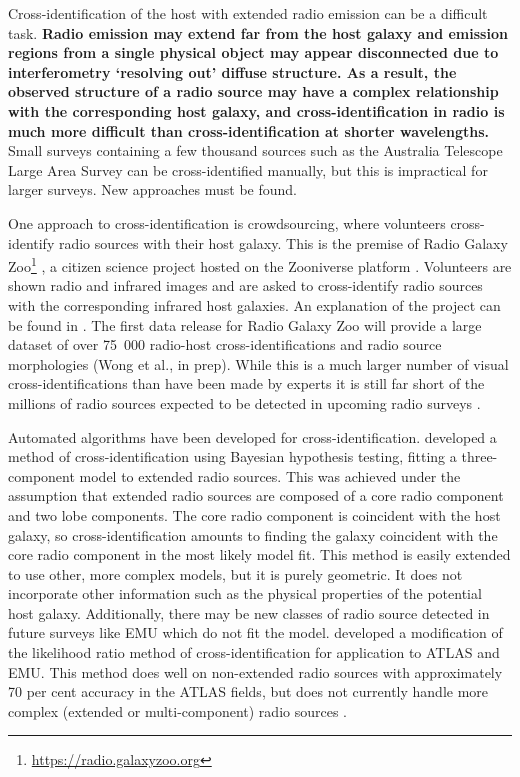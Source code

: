 \documentclass[fleqn,usenatbib,usedcolumn]{mnras}
\newcommand{\edited}[1]{{\bf {#1}}}
\begin{document}
  Cross-identification of the host with extended radio emission can be a
  difficult task. \edited{Radio emission may extend far from the host galaxy
  and emission regions from a single physical object may appear disconnected
  due to interferometry `resolving out' diffuse structure. As a result, the
  observed structure of a radio source may have a complex relationship
  with the corresponding host galaxy, and cross-identification in radio is
  much more difficult than cross-identification at shorter wavelengths.} Small surveys
  containing a few thousand sources such as the Australia Telescope Large Area Survey
  \citep[ATLAS;][]{norris06, middelberg08} can be cross-identified manually,
  but this is impractical for larger surveys. New approaches must be found.

  One approach to cross-identification is crowdsourcing, where volunteers
  cross-identify radio sources with their host galaxy. This is the premise of Radio Galaxy
  Zoo\footnote{\url{https://radio.galaxyzoo.org}} \citep{banfield15}, a
  citizen science project hosted on the Zooniverse platform \citep{lintott08}.
  Volunteers are shown radio and infrared images and are asked to
  cross-identify radio sources with the corresponding infrared host galaxies. An
  explanation of the project can be found in \citet{banfield15}. The first
  data release for Radio Galaxy Zoo will provide a large dataset of over
  75~000 radio-host cross-identifications and radio source morphologies
  (Wong et al., in prep). While this is a much larger number of visual
  cross-identifications than have been made by experts \citep[e.g.,
  ][]{Taylor2007,Gendre2008,Grant2010,norris06,middelberg08} it is still far
  short of the millions of radio sources expected to be detected in upcoming
  radio surveys \citep{norris17surveys}.

  Automated algorithms have been developed for cross-identification.
  \citet{fan15} developed a method of cross-identification using Bayesian
  hypothesis testing, fitting a three-component model to extended radio
  sources. This was achieved under the assumption that extended radio sources
  are composed of a core radio component and two lobe components. The core
  radio component is coincident with the host galaxy, so cross-identification
  amounts to finding the galaxy coincident with the core radio component in
  the most likely model fit. This method is easily extended to use other, more
  complex models, but it is purely geometric. It does not incorporate
  other information such as the physical properties of the potential host
  galaxy. Additionally, there may be new classes of radio source detected in
  future surveys like EMU which do not fit the model. \citet{weston18lrpy}
  developed a modification of the likelihood ratio method of
  cross-identification \citep{richter75likelihood} for application to ATLAS
  and EMU. This method does well on non-extended radio sources
  with approximately 70 per cent accuracy in the ATLAS fields, but does
  not currently handle more complex (extended or multi-component) radio sources
  \citep{norris17unexpected}.
\end{document}
